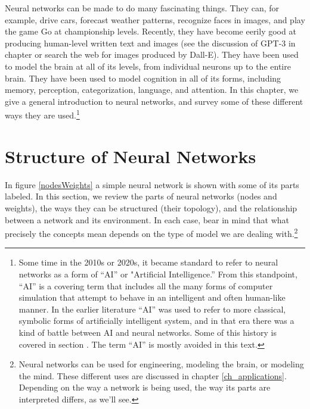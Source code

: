 Neural networks can be made to do many fascinating things. They can, for example, drive cars, forecast weather patterns, recognize faces in images, and play the game Go at championship levels. Recently, they have become eerily good at producing human-level written text and images (see the discussion of GPT-3 in chapter  or search the web for images produced by Dall-E). They have been used to model the brain at all of its levels, from individual neurons up to the entire brain. They have been used to model cognition in all of its forms, including memory, perception, categorization, language, and attention. In this chapter, we give a general introduction to neural networks, and survey some of these different ways they are used.\footnote{Some time in the 2010s or 2020s, it became standard to refer to neural networks as a form of ``AI'' or "Artificial Intelligence.''  From this standpoint, ``AI'' is a covering term that includes all the many forms of computer simulation that attempt to behave in an intelligent and often human-like manner.  In the earlier literature ``AI'' was used to refer to more classical, symbolic forms of artificially intelligent system, and in that era there was a kind of battle between AI and neural networks. Some of this history is covered in section .  The term ``AI'' is mostly avoided in this text.}

\section{Structure of Neural Networks}\label{structureNets}

In figure \ref{nodesWeights} a simple neural network is shown with some of its parts labeled. In this section, we review the parts of neural networks (nodes and weights), the ways they can be structured (their topology), and the relationship between a network and its environment. In each case, bear in mind that what precisely the concepts mean depends on the type of model we are dealing with.\footnote{Neural networks can be used for engineering, modeling the brain, or modeling the mind. These different uses are discussed in chapter \ref{ch_applications}. Depending on the way a network is being used, the way its parts are interpreted differs, as we'll see.} 

